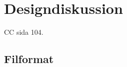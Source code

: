 \documentclass{TDP005mall}
\begin{document}



\section{Designdiskussion}%

CC sida 104.


\subsection{Filformat}


\newpage
\printbibliography
\end{document}
